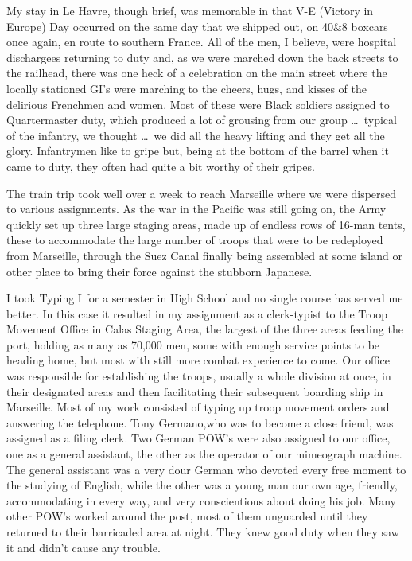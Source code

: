 \documentclass[../m3y]{subfiles}
\begin{document}
My stay in Le Havre, though brief, was memorable in that V-E (Victory in Europe) Day occurred on the same day that we shipped out, on 40\thinspace{}\&\thinspace{}8 boxcars once again, en route to southern France. All of the men, I believe, were hospital dischargees returning to duty and, as we were marched down the back streets to the railhead, there was one heck of a celebration on the main street where the locally stationed GI's were marching to the cheers, hugs, and kisses of the delirious Frenchmen and women. Most of these were Black soldiers assigned to Quartermaster duty, which produced a lot of grousing from our group \ldots\ typical of the infantry, we thought \ldots\ we did all the heavy lifting and they get all the glory. Infantrymen like to gripe but, being at the bottom of the barrel when it came to duty, they often had quite a bit worthy of their gripes.

The train trip took well over a week to reach Marseille where we were dispersed to various assignments. As the war in the Pacific was still going on, the Army quickly set up three large staging areas, made up of endless rows of 16-man tents, these to accommodate the large number of troops that were to be redeployed from Marseille, through the Suez Canal finally being assembled at some island or other place to bring their force against the stubborn Japanese.

I took Typing I for a semester in High School and no single course has served me better. In this case it resulted in my assignment as a clerk-typist to the Troop Movement Office in Calas Staging Area, the largest of the three areas feeding the port, holding as many as 70,000 men, some with enough service points to be heading home, but most with still more combat experience to come. Our office was responsible for establishing the troops, usually a whole division at once, in their designated areas and then facilitating their subsequent boarding ship in Marseille. Most of my work consisted of typing up troop movement orders and answering the telephone. Tony Germano,who was to become a close friend, was assigned as a filing clerk. Two German POW's were also assigned to our office, one as a general assistant, the other as the operator of our mimeograph machine. The general assistant was a very dour German who devoted every free moment to the studying of English, while the other was a young man our own age, friendly, accommodating in every way, and very conscientious about doing his job. Many other POW's worked around the post, most of them unguarded until they returned to their barricaded area at night. They knew good duty when they saw it and didn't cause any trouble.
\end{document}
